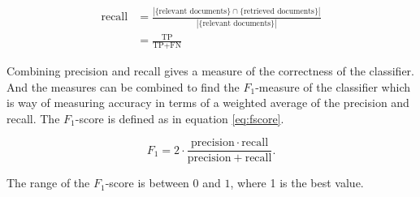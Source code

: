 \begin{equation} \label{eq:recall} 
\begin{split}
\text{recall} & =\frac{|\{\text{relevant documents}\}\cap\{\text{retrieved documents}\}|}{|\{\text{relevant documents}\}|} \\
 & = \frac{\text{TP}}{\text{TP}+\text{FN}}
\end{split}
\end{equation}

Combining precision and recall gives a measure of the correctness of the classifier. And the measures can be combined to find the $F_{1}$-measure of the classifier which is way of measuring accuracy in terms of a weighted average of the precision and recall. The $F_{1}$-score is defined as in equation \ref{eq:fscore}\cite{wiki:fscore}. 

\begin{equation} \label{eq:fscore}
F_1 = 2 \cdot \frac{\mathrm{precision} \cdot \mathrm{recall}}{\mathrm{precision} + \mathrm{recall}}.
\end{equation}

The range of the $F_{1}$-score is between $0$ and $1$, where 1 is the best value. 

